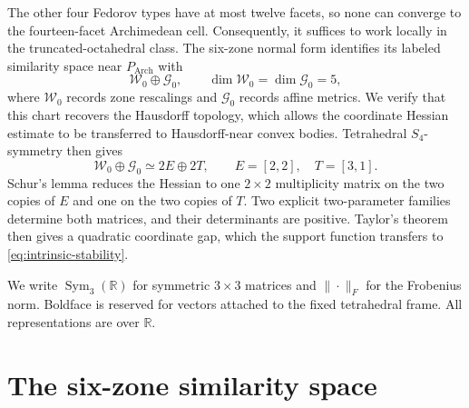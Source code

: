 \documentclass[11pt]{article}
\newcommand{\R}{\mathbb R}
\newcommand{\Sym}{\operatorname{Sym}}
\newcommand{\Arch}{P_{\mathrm{Arch}}}
\theoremstyle{remark}
\begin{document}
The other four Fedorov types have at most twelve facets, so none can converge to the fourteen-facet Archimedean cell.  Consequently, it suffices to work locally in the truncated-octahedral class.  The six-zone normal form identifies its labeled similarity space near $\Arch$ with
\[
 \mathcal W_0\oplus\mathcal G_0,
 \qquad \dim\mathcal W_0=\dim\mathcal G_0=5,
\]
where $\mathcal W_0$ records zone rescalings and $\mathcal G_0$ records affine metrics.
We verify that this chart recovers the Hausdorff topology, which allows the coordinate Hessian estimate to be transferred to Hausdorff-near convex bodies.  Tetrahedral $S_4$-symmetry then gives
\[
 \mathcal W_0\oplus\mathcal G_0\simeq2E\oplus2T,
 \qquad E=[2,2],\quad T=[3,1].
\]
Schur's lemma reduces the Hessian to one $2\times2$ multiplicity matrix on the two copies of $E$ and one on the two copies of $T$.  Two explicit two-parameter families determine both matrices, and their determinants are positive.  Taylor's theorem then gives a quadratic coordinate gap, which the support function transfers to \eqref{eq:intrinsic-stability}.

We write $\Sym_3(\R)$ for symmetric $3\times3$ matrices and $\|\cdot\|_F$ for the Frobenius norm.  
Boldface is reserved for vectors attached to the fixed tetrahedral frame.
All representations are over $\R$.

\section{The six-zone similarity space}
\end{document}
